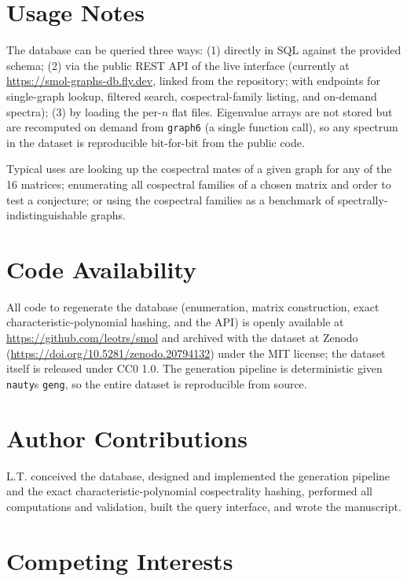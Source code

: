 \documentclass[
]{article}
\begin{document}
\section{Usage Notes}\label{sec-usage}

The database can be queried three ways: (1) directly in SQL against the
provided schema; (2) via the public REST API of the live interface
(currently at \url{https://smol-graphs-db.fly.dev}, linked from the
repository; with endpoints for single-graph lookup, filtered search,
cospectral-family listing, and on-demand spectra); (3) by loading the
per-\(n\) flat files. Eigenvalue arrays are not stored but are
recomputed on demand from \texttt{graph6} (a single function call), so
any spectrum in the dataset is reproducible bit-for-bit from the public
code.

Typical uses are looking up the cospectral mates of a given graph for
any of the 16 matrices; enumerating all cospectral families of a chosen
matrix and order to test a conjecture; or using the cospectral families
as a benchmark of spectrally-indistinguishable graphs.

\section{Code Availability}\label{sec-code}

All code to regenerate the database (enumeration, matrix construction,
exact characteristic-polynomial hashing, and the API) is openly
available at \url{https://github.com/leotrs/smol} and archived with the
dataset at Zenodo (\url{https://doi.org/10.5281/zenodo.20794132}) under
the MIT license; the dataset itself is released under CC0 1.0. The
generation pipeline is deterministic given
\texttt{nauty}\textquotesingle s \texttt{geng}, so the entire dataset is
reproducible from source.

\section{Author Contributions}\label{sec-contributions}

L.T. conceived the database, designed and implemented the generation
pipeline and the exact characteristic-polynomial cospectrality hashing,
performed all computations and validation, built the query interface,
and wrote the manuscript.

\section{Competing Interests}\label{sec-competing}
\end{document}

